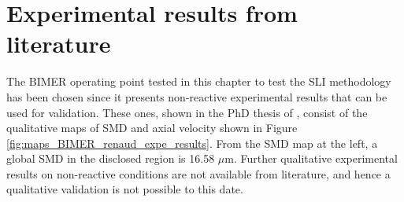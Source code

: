 




\section{Experimental results from literature}
\label{ch9:sec_expe_results_LGS_BIMER}

The BIMER operating point tested in this chapter to test the SLI methodology has been chosen since it presents non-reactive experimental results that can be used for validation. These ones, shown in the PhD thesis of , consist of the qualitative maps of SMD and axial velocity shown in Figure \ref{fig:maps_BIMER_renaud_expe_results}. From the SMD map at the left, a global SMD in the disclosed region is 16.58 $\mu$m. Further qualitative experimental results on non-reactive conditions are not available from literature, and hence a qualitative validation is not possible to this date.

